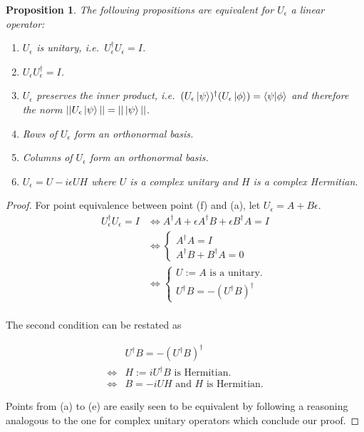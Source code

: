 \documentclass{article}
\newtheorem{proposition}[theorem]{Proposition}
\newcommand{\e}{\epsilon}
\begin{document}
\begin{proposition}\label{pr:unitary}
The following propositions are equivalent for $U_\e$ a linear operator:

\begin{enumerate}
 \item[a] $U_\e$ is unitary, i.e.\ $U_\e^\dagger U_\e = I$.
 \item[b] $U_\e U_\e^\dagger = I$.
 \item[c] $U_\e$ preserves the inner product, i.e.\ $(U_\e \ket\psi)^\dagger (U_\e \ket\phi) = \braket{\psi|\phi}$ and therefore the norm $||U_\e \ket\psi|| = ||\ket\psi||$.
 \item[d] Rows of $U_\e$ form an orthonormal basis.
 \item[e] Columns of $U_\e$ form an orthonormal basis.
 \item[f] $U_\e = U - i \e U H$ where $U$ is a complex unitary and $H$ is a complex Hermitian.
\end{enumerate}
\end{proposition}
\begin{proof}
 For point equivalence between point (f) and (a), let $U_\e = A + B\e$.
\begin{equation}
 \begin{split}
  U_\e^\dagger U_\e = I &\iff A^\dagger A + \e A^\dagger B + \e B^\dagger A = I\\
                        &\iff \begin{cases}
      A^\dagger A = I \\
      A^\dagger B + B^\dagger A = 0
   \end{cases}\\
                        &\iff \begin{cases}
      U := A \text{ is a unitary.} \\
      U^\dagger B = - (U^\dagger B)^\dagger
   \end{cases}\\
 \end{split}
\end{equation}

The second condition can be restated as

\begin{equation}
 \begin{split}
      &U^\dagger B = - (U^\dagger B)^\dagger\\
      \iff &H := i U^\dagger B  \text{ is Hermitian.}\\
      \iff &B = -iUH \text{ and } H \text{ is Hermitian.}
 \end{split}
\end{equation}

Points from (a) to (e) are easily seen to be equivalent by following a reasoning analogous to the one for complex unitary operators which conclude our proof.

\end{proof}
\end{document}
